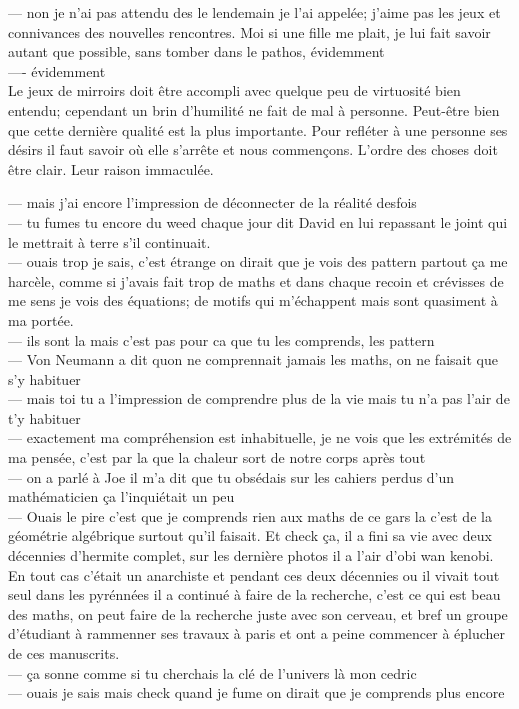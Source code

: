 \documentclass{article}
\begin{document}
--- non je n'ai pas attendu des le lendemain je l'ai appelée; j'aime pas les
jeux et connivances des nouvelles rencontres. Moi si une fille me plait, je lui
fait savoir autant que possible, sans tomber dans le pathos, évidemment\\
---- évidemment\\

Le jeux de mirroirs doit être accompli avec quelque peu de virtuosité bien
entendu; cependant un brin d'humilité ne fait de mal à personne. Peut-être
bien que cette dernière qualité est la plus importante. Pour refléter à une personne
ses désirs il faut savoir où elle s'arrête et nous commençons. L'ordre des choses
doit être clair. Leur raison immaculée.


--- mais j'ai encore l'impression de déconnecter de la réalité desfois\\
--- tu fumes tu encore du weed chaque jour dit David en lui repassant le joint qui le mettrait
à terre s'il continuait.\\
--- ouais trop je sais, c'est étrange on dirait que je vois des pattern partout ça me harcèle,
comme si j'avais fait trop de maths et dans chaque recoin et crévisses de me sens je vois des équations;
de motifs qui m'échappent mais sont quasiment à ma portée.\\
--- ils sont la mais c'est pas pour ca que tu les comprends, les pattern \\
--- Von Neumann a dit quon ne comprennait jamais les maths, on ne faisait que s'y habituer\\
--- mais toi tu a l'impression de comprendre plus de la vie mais tu n'a pas l'air de t'y habituer\\
--- exactement ma compréhension est inhabituelle, je ne vois que les extrémités de ma pensée,
c'est par la que la chaleur sort de notre corps après tout\\
---  on a parlé  à Joe il m'a dit que tu obsédais sur les cahiers perdus d'un mathématicien
ça l'inquiétait un peu\\
--- Ouais le pire c'est que je comprends rien aux maths de ce gars la c'est de la géométrie algébrique
surtout qu'il faisait. Et check ça, il a fini sa vie avec deux décennies d'hermite complet, sur les
dernière photos il a l'air d'obi wan kenobi. En tout cas c'était un anarchiste et pendant ces
deux décennies ou il vivait tout seul dans les pyrénnées il a continué à faire de la recherche,
c'est ce qui est beau des maths, on peut faire de la recherche juste avec son cerveau, et bref
un groupe d'étudiant à rammenner ses travaux à paris et ont a peine commencer à
éplucher de ces manuscrits.\\
--- ça sonne comme si tu cherchais la clé de l'univers là mon cedric\\
--- ouais je sais mais check quand je fume on dirait que je comprends plus encore\\
\end{document}

